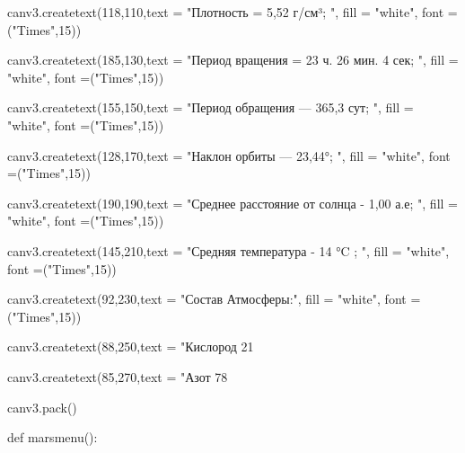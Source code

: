 \documentclass[14pt, oneside]{SavkinSeliverstov}
\begin{document}
	canv\underline{\hspace{0.2cm}}3.create\underline{\hspace{0.2cm}}text(118,110,text = "Плотность = 5,52 г/см³; ", fill = "white", font =("Times",15))

	canv\underline{\hspace{0.2cm}}3.create\underline{\hspace{0.2cm}}text(185,130,text = "Период вращения = 23 ч. 26 мин. 4 сек; ", fill = "white", font =("Times",15))

	canv\underline{\hspace{0.2cm}}3.create\underline{\hspace{0.2cm}}text(155,150,text = "Период обращения — 365,3 сут; ", fill = "white", font =("Times",15))
	
	canv\underline{\hspace{0.2cm}}3.create\underline{\hspace{0.2cm}}text(128,170,text = "Наклон орбиты — 23,44°; ", fill = "white", font =("Times",15))

	canv\underline{\hspace{0.2cm}}3.create\underline{\hspace{0.2cm}}text(190,190,text = "Среднее расстояние от солнца - 1,00 а.е; ", fill = "white", font =("Times",15))
	
	canv\underline{\hspace{0.2cm}}3.create\underline{\hspace{0.2cm}}text(145,210,text = "Средняя температура - 14 °C ; ", fill = "white", font =("Times",15))

	canv\underline{\hspace{0.2cm}}3.create\underline{\hspace{0.2cm}}text(92,230,text = "Состав Атмосферы:", fill = "white", font =("Times",15))
	
	canv\underline{\hspace{0.2cm}}3.create\underline{\hspace{0.2cm}}text(88,250,text = "Кислород 21 %

	canv\underline{\hspace{0.2cm}}3.create\underline{\hspace{0.2cm}}text(85,270,text = "Азот 78%

	canv\underline{\hspace{0.2cm}}3.pack()

def mars\underline{\hspace{0.2cm}}menu():
	
\end{document}

